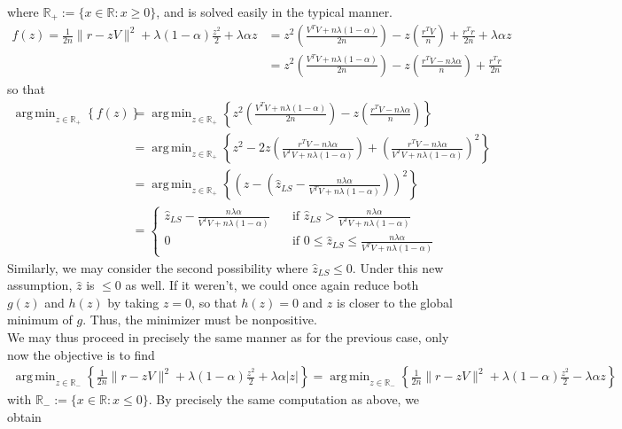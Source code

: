 \documentclass[10pt]{article}
\newcommand{\bp}[1]{\left({#1}\right)}
\newcommand{\mbb}[1]{\mathbb{#1}}
\newcommand{\1}[1]{\mathbbm{1}_{#1}}
\DeclareMathOperator{\argmin}{arg\,min}
\begin{document}
    where $\mbb{R}_+:=\{x\in\mbb{R}:x\geq 0\}$, and is solved easily in the typical manner.
    \begin{align*}
        f(z)=\frac{1}{2n}\|r-zV\|^2+\lambda(1-\alpha)\frac{z^2}{2}+\lambda\alpha z&=z^2\bp{\frac{V^TV+n\lambda(1-\alpha)}{2n}}-z\bp{\frac{r^TV}{n}}+\frac{r^Tr}{2n}+\lambda\alpha z\\
        &=z^2\bp{\frac{V^TV+n\lambda(1-\alpha)}{2n}}-z\bp{\frac{r^TV-n\lambda\alpha}{n}}+\frac{r^Tr}{2n}
    \end{align*}
    so that
    \begin{align*}
        \argmin_{z\in\mbb{R}_+}\left\{f(z)\right\}&=\argmin_{z\in\mbb{R}_+}\left\{z^2\bp{\frac{V^TV+n\lambda(1-\alpha)}{2n}}-z\bp{\frac{r^TV-n\lambda\alpha}{n}}\right\}\\
        &=\argmin_{z\in\mbb{R}_+}\left\{z^2-2z\bp{\frac{r^TV-n\lambda\alpha}{V^TV+n\lambda(1-\alpha)}}+\bp{\frac{r^TV-n\lambda\alpha}{V^TV+n\lambda(1-\alpha)}}^2\right\}\\
        &=\argmin_{z\in\mbb{R}_+}\left\{\bp{z-\bp{\hat{z}_{LS}-\frac{n\lambda\alpha}{V^TV+n\lambda(1-\alpha)}}}^2\right\}\\
        &=\begin{cases}
            \hat{z}_{LS}-\frac{n\lambda\alpha}{V^TV+n\lambda(1-\alpha)}\quad&\text{if $\hat{z}_{LS}>\tfrac{n\lambda\alpha}{V^TV+n\lambda(1-\alpha)}$}\\
            0\quad&\text{if $0\leq\hat{z}_{LS}\leq \tfrac{n\lambda\alpha}{V^TV+n\lambda(1-\alpha)}$}
        \end{cases}\tag{1}
    \end{align*}
    Similarly, we may consider the second possibility where $\hat{z}_{LS}\leq 0$. Under this new assumption, $\hat{z}$ is $\leq 0$ as well. If it weren't, we could once again reduce both $g(z)$ and $h(z)$ by taking
    $z=0$, so that $h(z)=0$ and $z$ is closer to the global minimum of $g$. Thus, the minimizer must be nonpositive.\\[5pt]
    We may thus proceed in precisely the same manner as for the previous case, only now the objective is to find
    \begin{align*}
        \argmin_{z\in\mbb{R}_-}\left\{\frac{1}{2n}\|r-zV\|^2+\lambda(1-\alpha)\frac{z^2}{2}+\lambda\alpha|z|\right\} = \argmin_{z\in\mbb{R}_-}\left\{\frac{1}{2n}\|r-zV\|^2+\lambda(1-\alpha)\frac{z^2}{2}-\lambda\alpha z\right\}
    \end{align*}
    with $\mbb{R}_-:=\{x\in\mbb{R}:x\leq 0\}$. By precisely the same computation as above, we obtain
\end{document}
